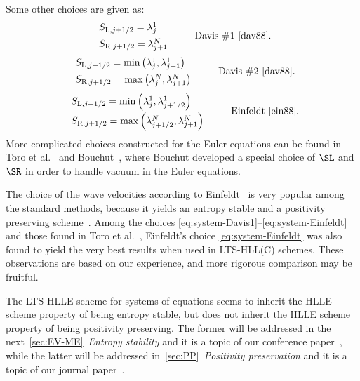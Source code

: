 Some other choices are given as:
\begin{equation} \label{eq:system-Davis1}
\left. \begin{array}{ll}
S_{\text{L},j+1/2} = \lambda_j^1 \\[0.5em]
S_{\text{R},j+1/2} = \lambda_{j+1}^N \end{array} \right. \qquad \text{Davis \#1~\cite{dav88}}.
\end{equation}
\begin{equation} \label{eq:system-Davis2}
\left. \begin{array}{ll}
S_{\text{L},j+1/2} = \min \left( \lambda_j^1,   \lambda_{j+1}^1 \right) \\[0.5em]
S_{\text{R},j+1/2} = \max \left( \lambda_{j}^N, \lambda_{j+1}^N \right) \end{array} \right. \qquad \text{Davis \#2~\cite{dav88}}.
\end{equation}
\begin{equation} \label{eq:system-Einfeldt}
\left. \begin{array}{ll}
S_{\text{L},j+1/2} = \min \left( \lambda_j^1, \lambda_{j+1/2}^1 \right) \\[0.5em]
S_{\text{R},j+1/2} = \max \left( \lambda_{j+1/2}^N, \lambda_{j+1}^N \right) \end{array} \right. \qquad \text{Einfeldt~\cite{ein88}}.
\end{equation} More complicated choices constructed for the Euler equations can be found in Toro et al.~\cite{tor94} and Bouchut~\cite{bou04}, where Bouchut developed a special choice of $ \SL $ and $ \SR $ in order to handle vacuum in the Euler equations. 

The choice of the wave velocities according to Einfeldt~\cite{ein88} is very popular among the standard methods, because it yields an entropy stable and a positivity preserving scheme~\cite{ein91}. Among the choices \eqref{eq:system-Davis1}--\eqref{eq:system-Einfeldt} and those found in Toro et al.~\cite{tor94}, Einfeldt's choice \eqref{eq:system-Einfeldt} was also found to yield the very best results when used in LTS-HLL(C) schemes. These observations are based on our experience, and more rigorous comparison may be fruitful.

The LTS-HLLE scheme for systems of equations seems to inherit the HLLE scheme property of being entropy stable, but does not inherit the HLLE scheme property of being positivity preserving. The former will be addressed in the next~\cref{sec:EV-ME}~\textit{Entropy stability} and it is a topic of our conference paper~\cite{cp2}, while the latter will be addressed in~\cref{sec:PP}~\textit{Positivity preservation} and it is a topic of our journal paper~\cite{jp3}. 
